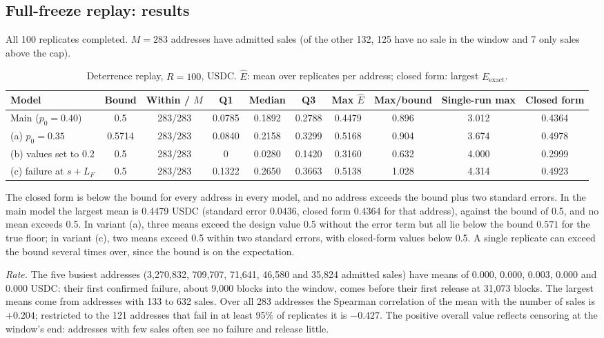 \documentclass[10pt,a4paper]{article}
\theoremstyle{plain}
\theoremstyle{remark}
\begin{document}
\subsection{Full-freeze replay: results}

All 100 replicates completed. $M=283$ addresses have admitted sales (of the other 132, 125 have no sale in the window and 7 only sales above the cap).

\begin{table}[!htbp]
\centering
\caption{Deterrence replay, $R=100$, USDC. $\hat E$: mean over replicates per address; closed form: largest $E_{\mathrm{exact}}$.}
\label{tab:det}
\footnotesize
\setlength{\tabcolsep}{4pt}
\begin{tabular}{@{}lccccccccc@{}}
\toprule
Model & Bound & Within / $M$ & Q1 & Median & Q3 & Max $\hat E$ & Max/bound & Single-run max & Closed form \\
\midrule
Main ($p_0=0.40$) & 0.5 & 283/283 & 0.0785 & 0.1892 & 0.2788 & 0.4479 & 0.896 & 3.012 & 0.4364 \\
(a) $p_0=0.35$ & 0.5714 & 283/283 & 0.0840 & 0.2158 & 0.3299 & 0.5168 & 0.904 & 3.674 & 0.4978 \\
(b) values set to 0.2 & 0.5 & 283/283 & 0 & 0.0280 & 0.1420 & 0.3160 & 0.632 & 4.000 & 0.2999 \\
(c) failure at $s+L_F$ & 0.5 & 283/283 & 0.1322 & 0.2650 & 0.3663 & 0.5138 & 1.028 & 4.314 & 0.4923 \\
\bottomrule
\end{tabular}
\end{table}

The closed form is below the bound for every address in every model, and no address exceeds the bound plus two standard errors. In the main model the largest mean is 0.4479 USDC (standard error 0.0436, closed form 0.4364 for that address), against the bound of 0.5, and no mean exceeds 0.5. In variant (a), three means exceed the design value 0.5 without the error term but all lie below the bound $0.571$ for the true floor; in variant (c), two means exceed 0.5 within two standard errors, with closed-form values below 0.5. A single replicate can exceed the bound several times over, since the bound is on the expectation.

\emph{Rate.} The five busiest addresses (3,270,832, 709,707, 71,641, 46,580 and 35,824 admitted sales) have means of 0.000, 0.000, 0.003, 0.000 and 0.000 USDC: their first confirmed failure, about 9,000 blocks into the window, comes before their first release at 31,073 blocks. The largest means come from addresses with 133 to 632 sales. Over all 283 addresses the Spearman correlation of the mean with the number of sales is $+0.204$; restricted to the 121 addresses that fail in at least 95\% of replicates it is $-0.427$. The positive overall value reflects censoring at the window's end: addresses with few sales often see no failure and release little.
\end{document}
